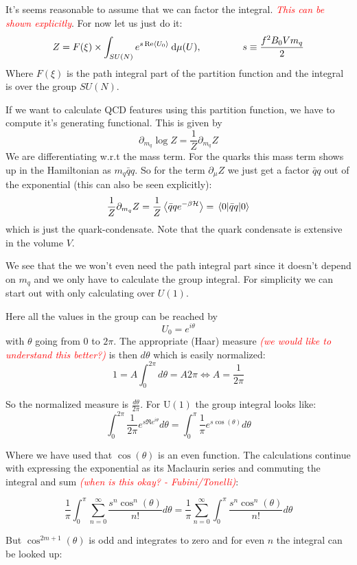 \documentclass[a4,10pt,titlepage]{article}
\renewcommand\[{\begin{equation*}}
\renewcommand\]{\end{equation*}}
\newcommand{\be}{\begin{equation}}
\newcommand{\ee}{\end{equation}}
\numberwithin{equation}{section}
\newcommand{\edit}[1]{\textcolor{red}{\textit{#1}}}
\newcommand{\ham}{\mathcal{H}}
\begin{document}
It's seems reasonable to assume that we can factor the integral. \edit{This can be shown explicitly}. For now let us just do it:
\be
Z=F(\xi)\times\int_{SU(N)} e^{s\Re\expval{U_0}}\:\dd\mu( U),\hspace*{1.5cm}s\equiv \frac{f^2B_0Vm_q}{2}
\ee
Where $F(\xi)$ is the path integral part of the partition function and the integral is over the group $SU(N)$.

If we want to calculate QCD features using this partition function, we have to compute it's generating functional. This is given by
\[
\partial_{m_q} \log Z = \frac{1}{Z}\partial_{m_q} Z
\]
We are differentiating w.r.t the mass term. For the quarks this mass term shows up in the Hamiltonian as $m_q \bar q q$. So for the term $\partial_\mu Z$ we just get a factor $\bar q q$ out of the exponential (this can also be seen explicitly):
\[
\frac{1}{Z}\partial_{m_q} Z=\frac{1}{Z}\expval{\bar q q e^{-\beta \ham}}=\mel{0}{\bar q q}{0}
\]
which is just the quark-condensate. Note that the quark condensate is extensive in the volume $V$.

We see that the we won't even need the path integral part since it doesn't depend on $m_q$ and we only have to calculate the group integral. For simplicity we can start out with only calculating over $U(1)$.

Here all the values in the group can be reached by
\[
U_0=e^{i\theta}
\]
with $\theta$ going from 0 to $2\pi$. The appropriate (Haar) measure \edit{(we would like to understand this better?)} is then $d\theta$ which is easily normalized:
\be
1=A\int_{0}^{2\pi}d\theta=A2\pi \Longleftrightarrow A=\frac{1}{2\pi}
\ee

So the normalized measure is $\frac{d\theta}{2\pi}$. For U$(1)$ the group integral looks like:
\be
\int_{0}^{2\pi} \frac{1}{2\pi} e^{s\Re{e^{i\theta}}}  d\theta = \int_{0}^{\pi} \frac{1}{\pi} e^{s\cos(\theta)} d\theta
\ee

Where we have used that $\cos(\theta)$ is an even function. The calculations continue with expressing the exponential as its Maclaurin series and commuting the integral and sum \edit{(when is this okay? - Fubini/Tonelli)}:

\be
 \frac{1}{\pi}\int_{0}^{\pi}\sum_{n=0}^{\infty}\frac{s^n\cos^n(\theta)}{n!}d\theta = \frac{1}{\pi}\sum_{n=0}^{\infty}\int_{0}^{\pi}\frac{s^n\cos^n(\theta)}{n!}d\theta
\ee

But $\cos^{2m+1}(\theta)$ is odd and integrates to zero and for even $n$ the integral can be looked up: 
\end{document}
